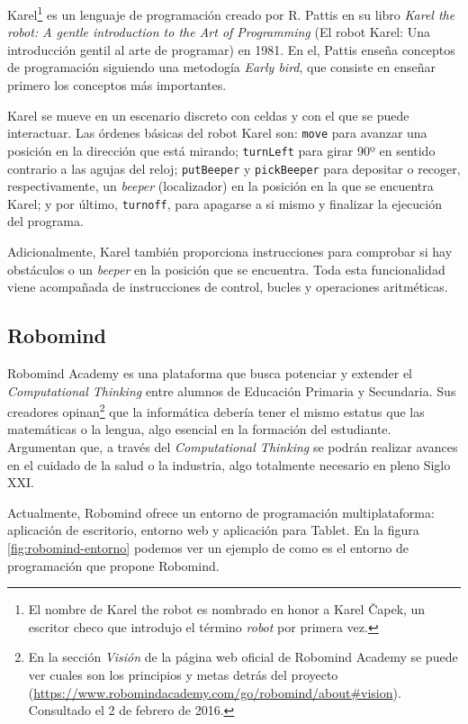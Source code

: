 Karel\footnote{El nombre de Karel the robot es nombrado en honor a Karel Čapek, un escritor checo que introdujo el término \emph{robot} por primera vez.} es un lenguaje de programación creado por R. Pattis en su libro \emph{Karel the robot: A gentle introduction to the Art of Programming} (El robot Karel: Una introducción gentil al arte de programar) en 1981\cite{pattis1981karel}. En el, Pattis enseña conceptos de programación siguiendo una metodogía \emph{Early bird}\cite{early-bird}, que consiste en enseñar primero los conceptos más importantes.

Karel se mueve en un escenario discreto con celdas y con el que se puede interactuar. Las órdenes básicas del robot Karel son: \texttt{move} para avanzar una posición en la dirección que está mirando; \texttt{turnLeft} para girar 90º en sentido contrario a las agujas del reloj; \texttt{putBeeper} y \texttt{pickBeeper} para depositar o recoger, respectivamente, un \emph{beeper} (localizador) en la posición en la que se encuentra Karel; y por último, \texttt{turnoff}, para apagarse a si mismo y finalizar la ejecución del programa.

Adicionalmente, Karel también proporciona instrucciones para comprobar si hay obstáculos o un \emph{beeper} en la posición que se encuentra. Toda esta funcionalidad viene acompañada de instrucciones de control, bucles y operaciones aritméticas.




\subsection{Robomind}
\label{sec:robomind}


Robomind Academy\cite{robomind-web} es una plataforma que busca potenciar y extender el \emph{Computational Thinking} entre alumnos de Educación Primaria y Secundaria. Sus creadores opinan\footnote{En la sección \emph{Visión} de la página web oficial de Robomind Academy se puede ver cuales son los principios y metas detrás del proyecto (\url{https://www.robomindacademy.com/go/robomind/about#vision}). Consultado el 2 de febrero de 2016.} que la informática debería tener el mismo estatus que las matemáticas o la lengua, algo esencial en la formación del estudiante. Argumentan que, a través del \emph{Computational Thinking} se podrán realizar avances en el cuidado de la salud o la industria, algo totalmente necesario en pleno Siglo XXI. 


Actualmente, Robomind ofrece un entorno de programación multiplataforma: aplicación de escritorio, entorno web y aplicación para Tablet. En la figura \ref{fig:robomind-entorno} podemos ver un ejemplo de como es el entorno de programación que propone Robomind.


